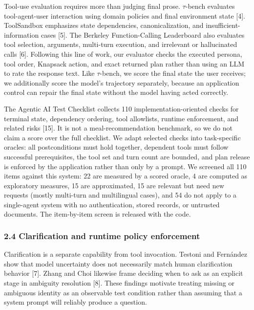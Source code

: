 \documentclass[
  10pt,
  letterpaper,
]{article}
\begin{document}
Tool-use evaluation requires more than judging final prose.
\(\tau\)-bench evaluates tool-agent-user interaction using domain
policies and final environment state {[}4{]}. ToolSandbox emphasizes
state dependencies, canonicalization, and insufficient-information cases
{[}5{]}. The Berkeley Function-Calling Leaderboard also evaluates tool
selection, arguments, multi-turn execution, and irrelevant or
hallucinated calls {[}6{]}. Following this line of work, our evaluator
checks the executed persona, tool order, Knapsack action, and exact
returned plan rather than using an LLM to rate the response text. Like
\(\tau\)-bench, we score the final state the user receives; we
additionally score the model's trajectory separately, because an
application control can repair the final state without the model having
acted correctly.

The Agentic AI Test Checklist collects 110 implementation-oriented
checks for terminal state, dependency ordering, tool allowlists, runtime
enforcement, and related risks {[}15{]}. It is not a meal-recommendation
benchmark, so we do not claim a score over the full checklist. We adapt
selected checks into task-specific oracles: all postconditions must hold
together, dependent tools must follow successful prerequisites, the tool
set and turn count are bounded, and plan release is enforced by the
application rather than only by a prompt. We screened all 110 items
against this system: 22 are measured by a scored oracle, 4 are computed
as exploratory measures, 15 are approximated, 15 are relevant but need
new requests (mostly multi-turn and multilingual cases), and 54 do not
apply to a single-agent system with no authentication, stored records,
or untrusted documents. The item-by-item screen is released with the
code.

\subsubsection{2.4 Clarification and runtime policy
enforcement}\label{clarification-and-runtime-policy-enforcement}

Clarification is a separate capability from tool invocation. Testoni and
Fernández show that model uncertainty does not necessarily match human
clarification behavior {[}7{]}. Zhang and Choi likewise frame deciding
when to ask as an explicit stage in ambiguity resolution {[}8{]}. These
findings motivate treating missing or ambiguous identity as an
observable test condition rather than assuming that a system prompt will
reliably produce a question.
\end{document}
